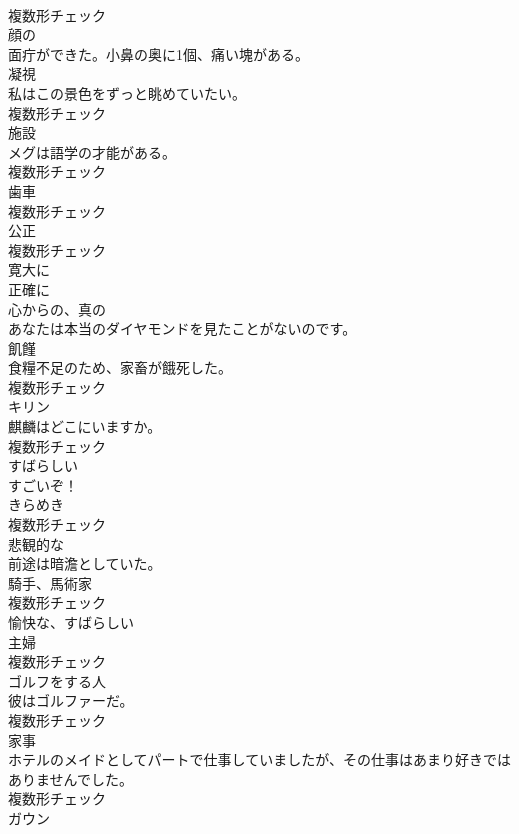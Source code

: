 \documentclass[8pt]{extreport}
\begin{document}
\begin{CJK}{UTF8}{min}
\\	複数形チェック
\\	[形容詞]	顔の	
\\	面疔ができた。小鼻の奥に1個、痛い塊がある。	
\\	[名詞]	凝視	
\\	私はこの景色をずっと眺めていたい。	
\\	複数形チェック
\\	[名詞]	施設	
\\	メグは語学の才能がある。	
\\	複数形チェック
\\	[名詞]	⻭車	
\\	複数形チェック
\\	[名詞]	公正	
\\	複数形チェック
\\	[副詞]	寛大に	
\\	[副詞]	正確に	
\\	[形容詞]	心からの、真の	
\\	あなたは本当のダイヤモンドを見たことがないのです。	
\\	[名詞]	飢饉	
\\	食糧不足のため、家畜が餓死した。	
\\	複数形チェック
\\	[名詞]	キリン	
\\	麒麟はどこにいますか。	
\\	複数形チェック
\\	[形容詞]	すばらしい	
\\	すごいぞ！	
\\	[名詞]	きらめき	
\\	複数形チェック
\\	[形容詞]	悲観的な	
\\	前途は暗澹としていた。	
\\	[名詞]	騎手、馬術家	
\\	複数形チェック
\\	[形容詞]	愉快な、すばらしい	
\\	[名詞]	主婦	
\\	複数形チェック
\\	[名詞]	ゴルフをする人	
\\	彼はゴルファーだ。	
\\	複数形チェック
\\	[名詞]	家事	
\\	ホテルのメイドとしてパートで仕事していましたが、その仕事はあまり好きではありませんでした。	
\\	複数形チェック
\\	[名詞]	ガウン	

\end{CJK}
\end{document}
